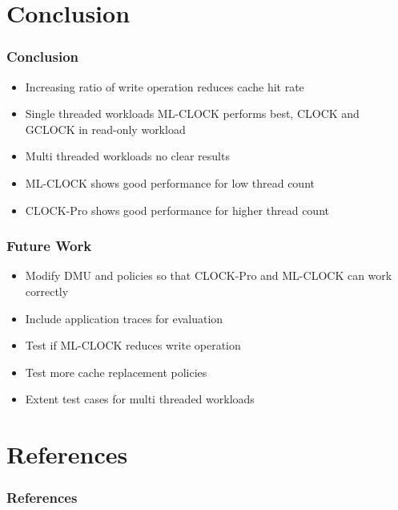 \documentclass[
	aspectratio=169,
	compress,
]{beamer}
\newcommand{\navframetitle}[1]{\frametitle{#1\hfill{\footnotesize\lastsection{}}}}
\begin{document}
\section{Conclusion}
\label{sec:conclusion}

\begin{frame}
	\navframetitle{Conclusion}

	\begin{itemize}
		\item Increasing ratio of write operation reduces cache hit rate
		\item Single threaded workloads ML-CLOCK performs best, CLOCK and GCLOCK in read-only workload
		\item Multi threaded workloads no clear results
		\item ML-CLOCK shows good performance for low thread count
		\item CLOCK-Pro shows good performance for higher thread count
	\end{itemize}
\end{frame}

\begin{frame}
	\navframetitle{Future Work}
	
	\begin{itemize}
		\item Modify DMU and policies so that CLOCK-Pro and ML-CLOCK can work correctly
		\item Include application traces for evaluation
		\item Test if ML-CLOCK reduces write operation
		\item Test more cache replacement policies
		\item Extent test cases for multi threaded workloads
	\end{itemize}
\end{frame}

\appendix

\AtBeginSection[]{}
\AtBeginSubsection[]{}

\section{References}

\begin{frame}[allowframebreaks]
	\frametitle{References}

	
	
\end{frame}
\end{document}
